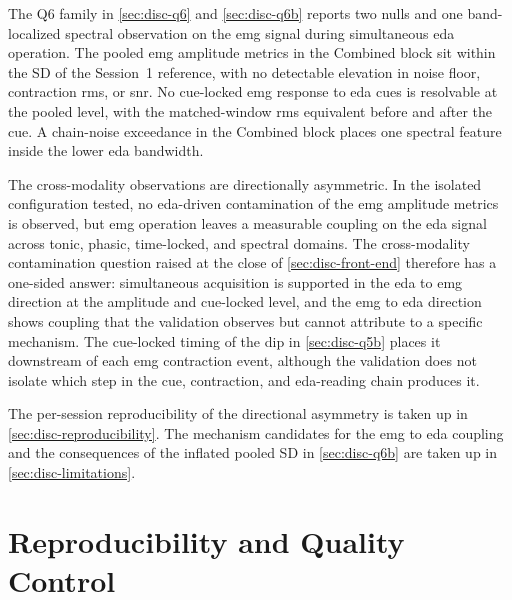 The Q6 family in \autoref{sec:disc-q6} and \autoref{sec:disc-q6b} reports two nulls and one band-localized spectral observation on the \gls{emg} signal during simultaneous \gls{eda} operation. The pooled \gls{emg} amplitude metrics in the Combined block sit within the SD of the Session~1 reference, with no detectable elevation in noise floor, contraction \gls{rms}, or \gls{snr}. No cue-locked \gls{emg} response to \gls{eda} cues is resolvable at the pooled level, with the matched-window \gls{rms} equivalent before and after the cue. A chain-noise exceedance in the Combined block places one spectral feature inside the lower \gls{eda} bandwidth.

The cross-modality observations are directionally asymmetric. In the isolated configuration tested, no \gls{eda}-driven contamination of the \gls{emg} amplitude metrics is observed, but \gls{emg} operation leaves a measurable coupling on the \gls{eda} signal across tonic, phasic, time-locked, and spectral domains. The cross-modality contamination question raised at the close of \autoref{sec:disc-front-end} therefore has a one-sided answer: simultaneous acquisition is supported in the \gls{eda} to \gls{emg} direction at the amplitude and cue-locked level, and the \gls{emg} to \gls{eda} direction shows coupling that the validation observes but cannot attribute to a specific mechanism. The cue-locked timing of the dip in \autoref{sec:disc-q5b} places it downstream of each \gls{emg} contraction event, although the validation does not isolate which step in the cue, contraction, and \gls{eda}-reading chain produces it.

The per-session reproducibility of the directional asymmetry is taken up in \autoref{sec:disc-reproducibility}. The mechanism candidates for the \gls{emg} to \gls{eda} coupling and the consequences of the inflated pooled SD in \autoref{sec:disc-q6b} are taken up in \autoref{sec:disc-limitations}.

\section{Reproducibility and Quality Control}
\label{sec:disc-reproducibility}

